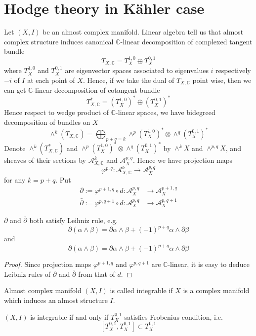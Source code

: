\documentclass[11pt,oneside,a4paper]{amsbook}
\begin{document}
\section{Hodge theory in K\"ahler case}
Let $(X,I)$ be an almost complex manifold. Linear algebra tell us that almost complex structure induces canonical $\mathbb{C}$-linear decomposition of complexed tangent bundle
\[
T_{X,\mathbb{C}}= T_{X}^{1,0} \oplus T_X^{0,1}
\]
where $T_X^{1,0}$ and $T_X^{0,1}$ are eigenvector spaces associated to eigenvalues $i$ respectively $-i$ of $I$ at each point of $X$. Hence, if we take the dual of $T_{X,\mathbb{C}}$ point wise, then we can get $\mathbb{C}$-linear decomposition of cotangent bundle
\[
T_{X,\mathbb{C}}^* = (T_X^{1,0})^* \oplus (T_X^{0,1})^*
\]
 Hence respect to wedge product of $\mathbb{C}$-linear spaces, we have bidegreed decomposition of bundles on $X$
\[
\wedge^k(T_{X,\mathbb{C}}) = \bigoplus_{p+q=k}\wedge^p (T_X^{1,0})^* \otimes \wedge^q (T_{X}^{0,1})^*
\]
Denote $\wedge^k(T_{X,\mathbb{C}}^*)$ and $\wedge^p(T_X^{1,0})^* \otimes \wedge^q(T_X^{0,1})^*$  by $\wedge^k X$ and $\wedge^{p,q}X$, and sheaves of their sections by $\mathcal{A}^k_{X,\mathbb{C}}$ and $\mathcal{A}^{p,q}_{X}$. Hence we have projection maps
\[
\varphi^{p,q}: \mathcal{A}^{k}_{X,\mathbb{C}} \rightarrow \mathcal{A}^{p,q}_X
\]
for any $k= p+q$. Put 
\[
\begin{aligned}
\partial:= \varphi^{p+1,q} \circ d : \mathcal{A}^{p,q}_{X} &\rightarrow \mathcal{A}^{p+1,q}_{X}  \\
\bar{\partial}:= \varphi^{p,q+1} \circ d: \mathcal{A}^{p,q}_X &\rightarrow \mathcal{A}^{p,q+1}_X
\end{aligned}
\]
\begin{seclemma}
	$\partial$ and $\bar{\partial}$ both satisfy Leihniz rule, e.g.
	\[
	\partial(\alpha \wedge \beta) = \partial{\alpha} \wedge \beta +(-1)^{p+q} \alpha \wedge \partial{\beta}
	\]
	and
	\[
	\bar{\partial}(\alpha \wedge \beta) = \bar{\partial}\alpha \wedge \beta + (-1)^{p+q}\alpha \wedge \bar{\partial} \beta
	\]
\end{seclemma}
\begin{proof}
	Since projection maps $\varphi^{p+1,q}$ and $\varphi^{p,q+1}$ are $\mathbb{C}$-linear, it is easy to deduce Leibniz rules of $\partial$ and $\bar{\partial}$ from that of $d$.
\end{proof}
\begin{secdefn}
	Almost complex manifold $(X,I)$ is called integrable if $X$ is a complex manifold which induces an almost structure $I$.
\end{secdefn}
\begin{secthm}
	$(X,I)$ is integrable if and only if $T_X^{0,1}$ satisfies Frobenius condition, i.e.
	\[
	[T_X^{0,1}, T_X^{0,1}] \subset T_X^{0,1}
	\]
\end{secthm}
\end{document}
